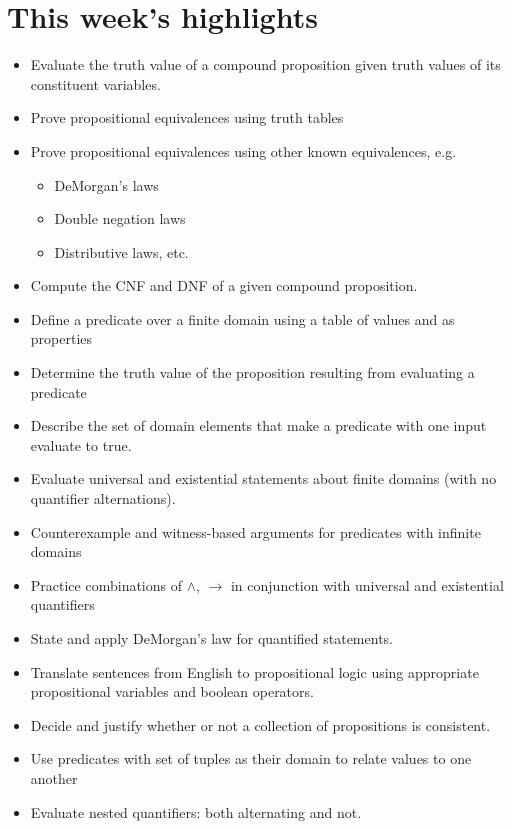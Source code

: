 \documentclass[12pt, oneside]{article}
\begin{document}
\begin{flushright}
\end{flushright}

\section*{This week's highlights}
\begin{itemize}
\item Evaluate the truth value of a compound proposition given truth values of its constituent variables.
\item Prove propositional equivalences using truth tables
\item Prove propositional equivalences using other known equivalences, e.g.
\begin{itemize}
\item DeMorgan's laws
\item Double negation laws
\item Distributive laws, etc.
\end{itemize}
\item Compute the CNF and DNF of a given compound proposition.
\item Define a predicate over a finite domain using a table of values and as properties
\item Determine the truth value of the proposition resulting from evaluating a predicate
\item Describe the set of domain elements that make a predicate with one input evaluate to true.
\item Evaluate universal and existential statements about finite domains (with no quantifier alternations).
\item Counterexample and witness-based arguments for predicates with infinite domains
\item Practice combinations of $\land$, $\rightarrow$ in conjunction with universal and existential quantifiers
\item State and apply DeMorgan's law for quantified statements.
\item Translate sentences from English to propositional logic using appropriate propositional variables and boolean operators.
\item Decide and justify whether or not a collection of propositions is consistent.

\item Use predicates with set of tuples as their domain to relate values to one another
\item Evaluate nested quantifiers: both alternating and not.
\end{itemize}
\end{document}
